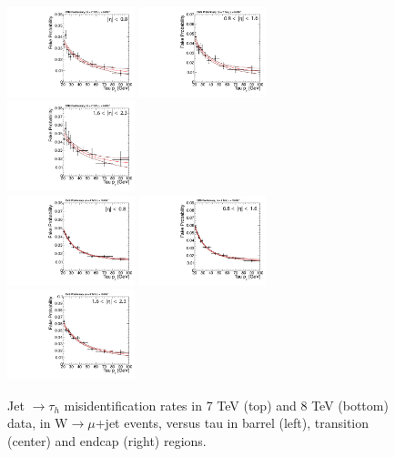 \begin{figure}
  \includegraphics[width=0.33\textwidth]{4_Analisys/pics/7TeV/fakerate_fits/tau_fr_barrel.pdf}
  \includegraphics[width=0.33\textwidth]{4_Analisys/pics/7TeV/fakerate_fits/tau_fr_transition.pdf}
  \includegraphics[width=0.33\textwidth]{4_Analisys/pics/7TeV/fakerate_fits/tau_fr_endcap.pdf}\\
  \includegraphics[width=0.33\textwidth]{4_Analisys/pics/8TeV/fakerate_fits/tau_fr_barrel.pdf}
  \includegraphics[width=0.33\textwidth]{4_Analisys/pics/8TeV/fakerate_fits/tau_fr_transition.pdf}
  \includegraphics[width=0.33\textwidth]{4_Analisys/pics/8TeV/fakerate_fits/tau_fr_endcap.pdf}
  \caption{Jet $\to \tau_h$ misidentification rates in 7 TeV (top) and 8 TeV (bottom) data, in W$\to \mu$+jet events, versus tau \pT in barrel (left), transition (center) and endcap (right) regions.}
  \label{fig:LLT_tau_FR}
\end{figure}


